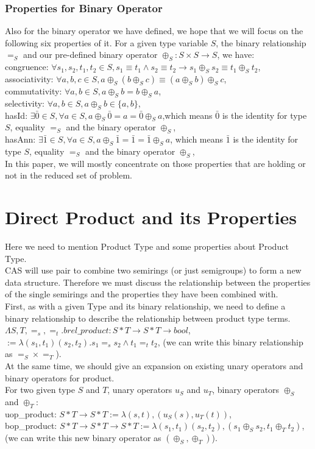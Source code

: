 \documentclass[a4paper,12pt,twoside,openright]{report}
\begin{document}
\subsubsection{Properties for Binary Operator}
Also for the binary operator we have defined, we hope that we will focus on the following six properties of it.
For a given type variable $S$, the binary relationship $=_S$ and our pre-defined binary operator $\oplus_S: S\times S \rightarrow S$, we have:\\
congruence: $\forall s_1,s_2,t_1,t_2 \in S, s_1 \equiv t_1 \wedge s_2 \equiv t_2 \rightarrow s_1 \oplus_S s_2 \equiv t_1 \oplus_S t_2$,\\
associativity: $\forall a,b,c \in S, a \oplus_S (b \oplus_S c) \equiv (a \oplus_S b) \oplus_S c$,\\
commutativity: $\forall a,b\in S, a \oplus_S b = b \oplus_S a$,\\
selectivity: $\forall a,b\in S, a \oplus_S b \in \{a,b\}$,\\
hasId: $\exists \bar0 \in S, \forall a \in S, a \oplus_S \bar0 = a = \bar0 \oplus_S a$,which means $\bar0$ is the identity for type $S$, equality $=_S$ and the binary operator $\oplus_S$,\\
hasAnn: $\exists \bar1 \in S, \forall a \in S, a \oplus_S \bar1 = \bar1 = \bar1 \oplus_S a$, which means $\bar1$ is the identity for type $S$, equality $=_S$ and the binary operator $\oplus_S$,\\
In this paper, we will mostly concentrate on those properties that are holding or not in the reduced set of problem. 


\section{Direct Product and its Properties}
Here we need to mention Product Type and some properties about Product Type. \\
CAS will use pair to combine two semirings (or just semigroups) to form a new data structure. 
Therefore we must discuss the relationship between the properties of the single semirings and the properties they have been combined with. \\
First, as with a given Type and its binary relationship, we need to define a binary relationship to describe the relationship between product type terms.\\
$\Lambda S, T, =_s, =_t. brel\_product : S * T \rightarrow S * T \rightarrow bool$, \\
$:= \lambda (s_1,t_1) (s_2, t_2). s_1 =_s s_2 \wedge t_1 =_t t_2$, (we can write this binary relationship as $=_S \times =_T$).\\
At the same time, we should give an expansion on existing unary operators and binary operators for product.\\
For two given type $S$ and $T$, unary operators $u_S$ and $u_T$, binary operators $\oplus_S$ and $\oplus_T$:\\
uop\_product: $S*T \rightarrow S*T := \lambda (s,t), (u_S (s),u_T(t))$,\\
bop\_product: $S*T \rightarrow S*T \rightarrow S*T := \lambda (s_1,t_1)(s_2,t_2), (s_1 \oplus_S s_2,t_1 \oplus_T t_2)$, (we can write this new binary operator as $(\oplus_S,\oplus_T)$).
\end{document}
